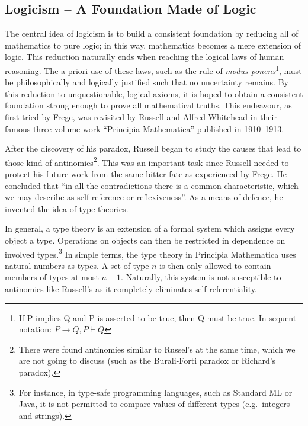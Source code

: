 \documentclass{article}
\begin{document}
\subsection{Logicism -- A Foundation Made of Logic}\label{ssec_logicism}
The central idea of logicism is to build a consistent foundation by reducing all of mathematics to pure logic; in this way, mathematics becomes a mere extension of logic. This reduction naturally ends when reaching the logical laws of human reasoning. The a priori use of these laws, such as the rule of \textit{modus ponens}\footnote{If P implies Q and P is asserted to be true, then Q must be true. In sequent notation: $P\rightarrow Q, P\vdash Q$}, must be philosophically and logically justified such that no uncertainty remains. By this reduction to unquestionable, logical axioms, it is hoped to obtain a consistent foundation strong enough to prove all mathematical truths. This endeavour, as first tried by Frege, was revisited by Russell and Alfred Whitehead in their famous three-volume work ``Principia Mathematica'' published in 1910--1913.

After the discovery of his paradox, Russell began to study the causes that lead to those kind of antinomies\footnote{There were found antinomies similar to Russel's at the same time, which we are not going to discuss (such as the Burali-Forti paradox or Richard's paradox).\cite[pp.~5--10]{fraenkel}}. This was an important task since Russell needed to protect his future work from the same bitter fate as experienced by Frege. He concluded that ``in all the contradictions there is a common characteristic, which we may describe as self-reference or reflexiveness''\cite[p. 224]{russell_self_referentiality}. As a means of defence, he invented the idea of type theories. 

In general, a type theory is an extension of a formal system which assigns every object a type. Operations on objects can then be restricted in dependence on involved types.\footnote{For instance, in type-safe programming languages, such as Standard ML or Java, it is not permitted to compare values of different types (e.g.\ integers and strings).} In simple terms, the type theory in Principia Mathematica uses natural numbers as types. A set of type $n$ is then only allowed to contain members of types at most $n-1$. Naturally, this system is not susceptible to antinomies like Russell's as it completely eliminates self-referentiality. 
\end{document}

